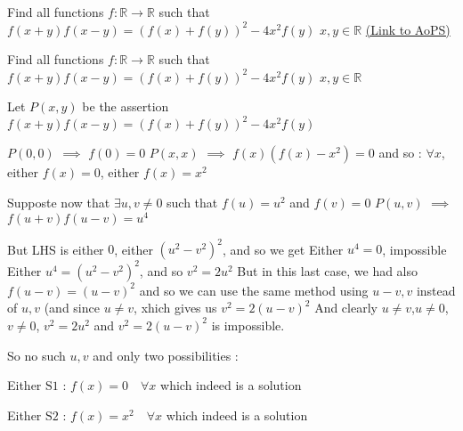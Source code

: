 \begin{problem}
	Find all functions \(f:\mathbb{R}\rightarrow\mathbb{R}\) such that 
\(f(x+y)f(x-y)=(f(x)+f(y))^2-4x^2f(y)\)
\(x,y\in\mathbb{R}\)
	\flushright \href{https://artofproblemsolving.com/community/c6h1585525}{(Link to AoPS)}
\end{problem}



\begin{solution}
	\begin{tcolorbox}Find all functions \(f:\mathbb{R}\rightarrow\mathbb{R}\) such that 
\(f(x+y)f(x-y)=(f(x)+f(y))^2-4x^2f(y)\)
\(x,y\in\mathbb{R}\)\end{tcolorbox}
Let $P(x,y)$ be the assertion $f(x+y)f(x-y)=(f(x)+f(y))^2-4x^2f(y)$

$P(0,0)$ $\implies$ $f(0)=0$
$P(x,x)$ $\implies$ $f(x)(f(x)-x^2)=0$ and so :
$\forall x$, either $f(x)=0$, either $f(x)=x^2$

Supposte now that $\exists u,v\ne 0$ such that $f(u)=u^2$ and $f(v)=0$
$P(u,v)$ $\implies$ $f(u+v)f(u-v)=u^4$

But LHS is either $0$, either $(u^2-v^2)^2$, and so we get 
Either $u^4=0$, impossible
Either $u^4=(u^2-v^2)^2$, and so $v^2=2u^2$
But in this last case, we had also $f(u-v)=(u-v)^2$ and so we can use the same method using $u-v,v$ instead of $u,v$ (and since $u\ne v$, xhich gives us $v^2=2(u-v)^2$
And clearly $u\ne v$,$u\ne 0$, $v\ne 0$, $v^2=2u^2$ and $v^2=2(u-v)^2$ is impossible.

So no such $u,v$ and only two possibilities :

Either $\boxed{\text{S1 : }f(x)=0\quad\forall x}$ which indeed is a solution

Either $\boxed{\text{S2 : }f(x)=x^2\quad\forall x}$ which indeed is a solution



\end{solution}



